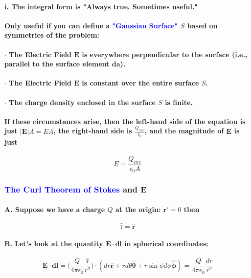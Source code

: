 \documentclass{article}
\begin{document}
\paragraph{i. The integral form is "Always true. Sometimes useful."}
\paragraph{Only useful if you can define a \textcolor{blue}{"Gaussian Surface"} $S$ based on symmetries of the problem:}
\paragraph{$\cdot$ The Electric Field $\boldsymbol{E}$ is everywhere perpendicular to the surface (i.e., parallel to the surface element $\boldsymbol{da}$).}
\paragraph{$\cdot$ The Electric Field $\boldsymbol{E}$ is constant over the entire surface $S$.}
\paragraph{$\cdot$ The charge density enclosed in the surface $S$ is finite.} 
\paragraph{If these circumstances arise, then the left-hand side of the equation is just $|\boldsymbol{E}|A=EA$, the right-hand side is $\frac{Q_{enc}}{\epsilon_0}$, and the magnitude of $\boldsymbol{E}$ is just} 
\begin{equation*}
    E=\frac{Q_{enc}}{\epsilon_0A}
\end{equation*}
\subsubsection{\textcolor{blue}{The Curl Theorem of Stokes} and $\boldsymbol{E}$}
\paragraph{A. Suppose we have a charge $Q$ at the origin: $\boldsymbol{r'}=0$ then }
\begin{equation*}
    \hat{\boldsymbol{\mathfrak{r}}}=\hat{\boldsymbol{r}}
\end{equation*}
\paragraph{B. Let's look at the quantity $\boldsymbol{E\cdot dl}$ in spherical coordinates:}
\begin{equation*}
    \boldsymbol{E\cdot dl}=\bigg(\frac{Q}{4\pi\epsilon_0}\frac{\hat{\boldsymbol{\mathfrak{r}}}}{r^2}\bigg)\cdot(dr\hat{\boldsymbol{r}}+rd\theta\hat{\boldsymbol{\theta}}+r\sin{\phi}d\phi\hat{\boldsymbol{\phi}})=\frac{Q}{4\pi \epsilon_0}\frac{dr}{r^2}
\end{equation*}
\end{document}
